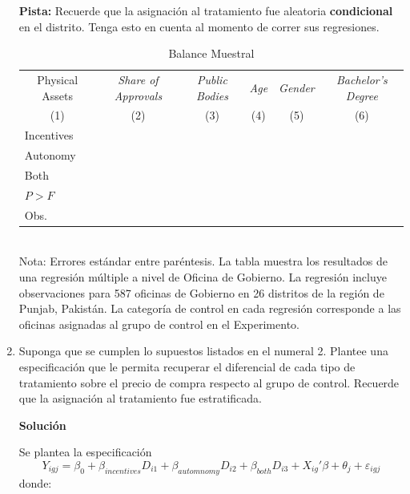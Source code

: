 \documentclass[a4paper, answers, addpoints, 11pt]{exam}
\newenvironment{solucion}{%
  \begin{mdframed}[
    backgroundcolor=blue!5,    %
    linecolor=blue!50,          %
    linewidth=2pt,              %
    leftmargin=10pt,            %
    rightmargin=8pt,           %
    topline=true,              %
    bottomline=true,            %
    roundcorner=10pt,           %
    innerleftmargin=10pt,       %
    innerrightmargin=10pt,      %
    innerbottommargin=10pt,     %
    innertopmargin=10pt         %
  ]%
  \begin{tcolorbox}[colframe=blue!50!black, colback=blue!50, coltitle=white, sharp corners=all, boxrule=1mm, width=\textwidth, halign=left, valign=center, top=0mm, bottom=0mm, left=0mm, right=0mm] \textbf{Solución} \end{tcolorbox} }{\end{mdframed}}
\begin{document}
\begin{enumerate}
\begin{enumerate}
         \end{enumerate}
        \bigbreak
        \textbf{Pista:} Recuerde que la asignación al tratamiento fue aleatoria \textbf{condicional} en el distrito. Tenga esto en cuenta al momento de correr sus regresiones. 
        \begin{table}[H]
		\centering
			\caption{Balance Muestral}
			\label{tab2:balancetemplacte}
			\begin{tabular}{lccccc}
				\toprule
				\multicolumn{1}{c}{Physical Assets} & \multicolumn{1}{c}{\textit{Share of Approvals}} & \textit{Public Bodies} & \textit{Age} & \textit{Gender} & \textit{Bachelor's Degree}  \\
				\multicolumn{1}{c}{(1)} & 	\multicolumn{1}{c}{(2)} & (3) & (4) & (5) & (6) \\ \toprule
				  \addlinespace 
				Incentives &&&& \\
                Autonomy &&&& \\
                Both &&&& \\ \midrule
                $P>F$ &&&& \\
                Obs.&&&& \\ \bottomrule
            \end{tabular}
             {\footnotesize{\\Nota: Errores estándar entre paréntesis. La tabla muestra los resultados de una regresión múltiple a nivel de Oficina de Gobierno. La regresión incluye observaciones para 587 oficinas de Gobierno en 26 distritos de la región de Punjab, Pakistán.  La categoría de control en cada regresión corresponde a las oficinas asignadas al grupo de control en el Experimento.}}
	\end{table}
      \item Suponga que se cumplen lo supuestos listados en el numeral 2. Plantee una especificación que le permita recuperar el diferencial de cada tipo de tratamiento sobre el precio de compra respecto al grupo de control. Recuerde que la asignación al tratamiento fue estratificada.
   \begin{solucion}
   Se plantea la especificación
   $$
Y_{igj} = \beta_0 + \beta_{incentives} D_{i1} + \beta_{automnomy} D_{i2} +  \beta_{both} D_{i3} + X_{ig}'\beta + \theta_{j}+  \varepsilon_{igj}$$
donde:
 


\end{solucion}
\end{enumerate}
\end{document}
